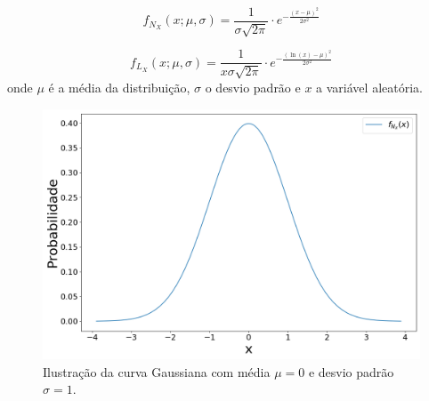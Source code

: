   
\begin{equation}
{\displaystyle f_{N_X}(x;\mu,\sigma) = \frac{1}{\sigma\sqrt{2\pi}}\cdot e^{-\frac{(x-\mu)^2}{2\sigma^2}}}
\label{equ:Normal}
\end{equation}

\begin{equation}
	{\displaystyle f_{L_X}(x;\mu ,\sigma )={\frac {1}{x\sigma {\sqrt {2\pi }}}}\cdot e^ {-\frac {\left(\ln(x)-\mu \right)^{2}}{2\sigma ^{2}}}}
	\label{eq:Lognormal}
\end{equation}
onde $\mu$ é a média da distribuição, $\sigma$ o desvio padrão e $x$ a variável aleatória.

\begin{figure}[H]
	\centering
	\includegraphics[width=0.8\linewidth]{./figuras/Normal}
	\caption{Ilustração da curva Gaussiana com média $\mu = 0$ e desvio padrão $\sigma = 1$.}
	\label{fig:Gaussiana}
\end{figure}

